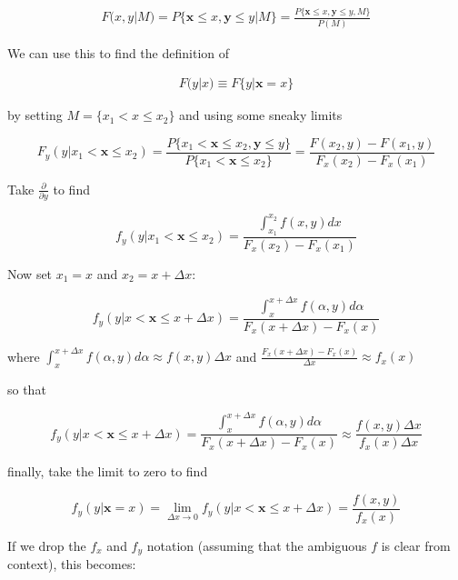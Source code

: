 \documentclass[preprint,authoryear,10pt]{elsarticle}
\begin{document}
\begin{align}
F(x, y | M) = P\{\bm{x} \leq x, \bm{y} \leq y | M\} = \frac{P\{\bm{x} \leq x, \bm{y} \leq y, M\}}{P(M)}
\end{align}

We can use this to find the definition of

\begin{align}
F(y | x) \equiv F\{y | \bm{x} = x\}
\end{align}

by setting $M = \{x_1 < x \leq x_2\}$ and using some sneaky limits

\begin{equation}
F_y(y | x_1 < \bm{x} \leq x_2)
    = \frac{P\{x_1 < \bm{x} \leq x_2, \bm{y} \leq y\}}{P\{x_1 < \bm{x} \leq x_2\}}
    = \frac{F(x_2,y) - F(x_1,y)}{F_x(x_2) - F_x(x_1)}
\end{equation}

Take $\frac{\partial}{\partial y}$ to find

\begin{equation}
f_y(y | x_1 < \bm{x} \leq x_2)
    = \frac{\int_{x_1}^{x_2} f(x, y)dx}{F_x(x_2) - F_x(x_1)}
\end{equation}

Now set $x_1 = x$ and $x_2 = x + \Delta x$:

\begin{equation}
f_y(y | x < \bm{x} \leq x + \Delta x)
    = \frac{\int_{x}^{x + \Delta x} f(\alpha, y)d\alpha}{F_x(x + \Delta x) - F_x(x)}
\end{equation}

where
$ \int_{x}^{x + \Delta x} f(\alpha, y)d\alpha \approx f(x, y) \Delta x $
and
$ \frac{F_x(x + \Delta x) - F_x(x)}{\Delta x} \approx f_x(x) $

so that

\begin{equation}
f_y(y | x < \bm{x} \leq x + \Delta x)
    = \frac{\int_{x}^{x + \Delta x} f(\alpha, y)d\alpha}{F_x(x + \Delta x) - F_x(x)}
    \approx \frac{f(x, y) \Delta x}{f_x(x) \Delta x}
\end{equation}

finally, take the limit to zero to find

\begin{equation}
f_y(y | \bm{x} = x)
    = \lim_{\Delta x \to 0} f_y(y | x < \bm{x} \leq x + \Delta x)
    = \frac{f(x, y)}{f_x(x)}
\end{equation}

If we drop the $f_x$ and $f_y$ notation (assuming that the ambiguous $f$ is
clear from context), this becomes:
\end{document}
